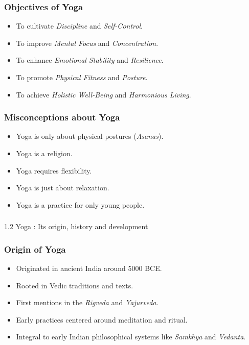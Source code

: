 \begin{frame}[fragile]\frametitle{Objectives of Yoga}

      \begin{itemize}
		\item To cultivate \textit{Discipline} and \textit{Self-Control}.
		\item To improve \textit{Mental Focus} and \textit{Concentration}.
		\item To enhance \textit{Emotional Stability} and \textit{Resilience}.
		\item To promote \textit{Physical Fitness} and \textit{Posture}.
		\item To achieve \textit{Holistic Well-Being} and \textit{Harmonious Living}.
	  \end{itemize}

\end{frame}

\begin{frame}[fragile]\frametitle{Misconceptions about Yoga}

      \begin{itemize}
		\item Yoga is only about physical postures (\textit{Asanas}).
		\item Yoga is a religion.
		\item Yoga requires flexibility.
		\item Yoga is just about relaxation.
		\item Yoga is a practice for only young people.
	  \end{itemize}

\end{frame}


\begin{frame}[fragile]\frametitle{}
\begin{center}
{\Large 1.2 Yoga : Its origin, history and development}
\end{center}
\end{frame}


\begin{frame}[fragile]\frametitle{Origin of Yoga}

      \begin{itemize}
		\item Originated in ancient India around 5000 BCE.
		\item Rooted in Vedic traditions and texts.
		\item First mentions in the \textit{Rigveda} and \textit{Yajurveda}.
		\item Early practices centered around meditation and ritual.
		\item Integral to early Indian philosophical systems like \textit{Samkhya} and \textit{Vedanta}.
	  \end{itemize}

\end{frame}

